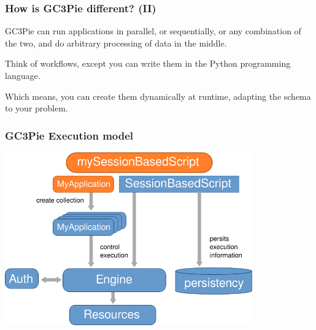 \documentclass[english,serif,mathserif,xcolor=pdftex,dvipsnames,table]{beamer}
\begin{document}
\begin{frame}
  \frametitle{How is GC3Pie different? (II)}

  \begin{block}{}
    GC3Pie can run applications in parallel, or sequentially, or any
    combination of the two, and do arbitrary processing of data in the
    middle.
  \end{block}

  \begin{block}{}
    Think of {\color{Blue}workflows}, except you can write them in the Python
    programming language.
  \end{block}

  \begin{block}{}
    Which means, you can create them dynamically at runtime, adapting
    the schema to your problem.
  \end{block}
\end{frame}

\begin{frame}
  \frametitle{GC3Pie Execution model}
  \includegraphics[width=0.8\textwidth]{fig/GC3Pie_execution_model}
\end{frame}
\end{document}
